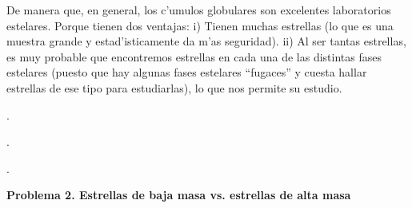 \documentclass{article}
\begin{document}
\begin{enumerate}[a)]
De manera que, en general, los c'umulos globulares son excelentes laboratorios estelares. Porque tienen dos ventajas: i) Tienen muchas estrellas (lo que es una muestra grande y estad'isticamente da m'as seguridad). ii) Al ser tantas estrellas, es muy probable que encontremos estrellas en cada una de las distintas fases estelares (puesto que hay algunas fases estelares ``fugaces'' y cuesta hallar estrellas de ese tipo para estudiarlas), lo que nos permite su estudio.
\end{enumerate}

\newpage
\begin{tiny}
.

.

.
\end{tiny}


\textbf{Problema 2. Estrellas de baja masa vs. estrellas de alta masa}

\vspace{3mm}
\end{document}
